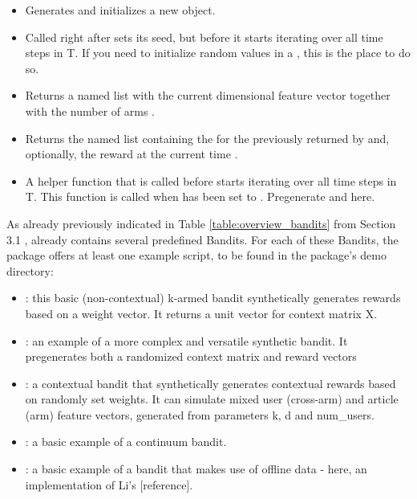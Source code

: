 \documentclass{jss}\usepackage[]{graphicx}\usepackage[]{color}
\begin{document}
\begin{itemize}
  \item{}{ Generates and initializes a new  object. }
  \item{}{
     Called right after  sets its seed,
     but before it starts iterating over all time steps  in T. If you need to initialize random values in a ,
     this is the place to do so.
  }
  \item{}{
     Returns a named list 
     with the current  dimensional  feature vector  together with the number of arms .
 }
  \item{}{
     Returns the named list  containing the 
     for the  previously returned by  and,
     optionally, the  reward
     at the current time .
 }
  \item{}{
     A helper function that is called before  starts iterating over all time steps  in T.
     This function is called when  has been set to .
     Pregenerate  and  here.
  }
\end{itemize}

As already previously indicated in Table \ref{table:overview_bandits} from Section 3.1 ,  already contains several predefined Bandits. For each of these Bandits, the package offers at least one example script, to be found in the package’s demo directory:

\begin{itemize}
         \item {}: this basic (non-contextual) k-armed bandit synthetically generates rewards based on a weight vector. It returns a unit vector for context matrix X.
                  \item {}: an example of a more complex and versatile synthetic bandit. It pregenerates both a randomized context matrix and reward vectors
         \item {}: a contextual bandit that synthetically generates contextual rewards based on randomly set weights. It can simulate mixed user (cross-arm) and article (arm) feature vectors, generated from parameters k, d and num\_users.
         \item {}: a basic example of a continuum bandit.
         \item {}: a basic example of a bandit that makes use of offline data - here, an implementation of Li's [reference].
\end{itemize}
\end{document}
